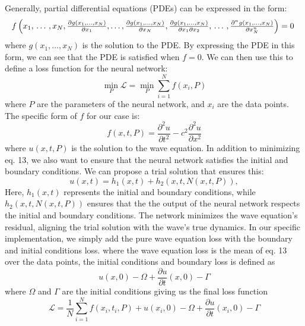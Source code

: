 \documentclass[twoside,11pt]{report}
\begin{document}
    Generally, partial differential equations (PDEs) can be expressed in the form:
    \begin{equation}
    \resizebox{1.0\textwidth}{!}{$
        f\left(x_1, \, \dots \, , x_N, \frac{\partial g(x_1,\dots,x_N) }{\partial x_1}, 
            \dots , \frac{\partial g(x_1,\dots,x_N) }{\partial x_N}, \frac{\partial g(x_1,\dots,x_N) }
        {\partial x_1\partial x_2}, \, \dots \, , \frac{\partial^n g(x_1,\dots,x_N) }
        {\partial x_N^n} \right) = 0$
    }
    \end{equation}
    where $g(x_1,\dots,x_N)$ is the solution to the PDE. By expressing the PDE in this form, we can 
    see that the PDE is satisfied when $f=0$. We can then use this to define a loss function for the neural network:
    \begin{equation}
    \min_{P} \mathcal{L} = \min_{P} \sum_{i=1}^{N} f(x_i, P)
    \end{equation}
    where $P$ are the parameters of the neural network, and $x_i$ are the data points. 
    The specific form of $f$ for our case is:
    \begin{equation}
    f(x,t,P) = \frac{\partial^2 u}{\partial t^2} - c^2 \frac{\partial^2 u}{\partial x^2}
    \end{equation}
    where $u(x,t,P)$ is the solution to the wave equation. 
    In addition to minimizing eq. 13, we also want to ensure that the neural network satisfies the 
    initial and boundary conditions. We can propose a trial solution that ensures this:
    \begin{equation}
    u(x, t) = h_1(x, t) + h_2(x, t, N(x, t, P)),
    \end{equation}
    Here, $h_1(x,t)$ represents the initial and boundary conditions,
    while $h_2(x,t, N(x,t,P))$ ensures that the the output of the neural network respects 
    the initial and boundary conditions.
    The network minimizes the wave equation's residual, aligning the trial solution with the wave's true dynamics.
    In our specific implementation, we simply add the pure wave equation loss with the boundary and initial conditions loss.
    where the wave equation loss is the mean of eq. 13 over the data points, the initial conditions and boundary loss
    is defined as
    \begin{equation}
        u(x, 0) - \Omega  + \frac{\partial u}{\partial t}(x, 0) - \Gamma
    \end{equation}
    where $\Omega$ and $\Gamma$ are the initial conditions
    giving us the final loss function
    \begin{equation}
        \mathcal{L} = \frac{1}{N}\sum_{i=1}^{N} f(x_i, t_i, P) + u(x_i, 0) - \Omega  + 
        \frac{\partial u}{\partial t}(x_i, 0) - \Gamma
    \end{equation}
    \cite{fys-stk}
    \cite{krishnapriyan2021characterizing}
\end{document}
